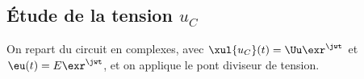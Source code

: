 \documentclass[../../main/main.tex]{subfiles}
\begin{document}
\begin{tcb}
\begin{isd}
		\begin{center}
			\vspace{-15pt}
		\end{center}
	\end{isd}
\end{tcb}

\subsection{Étude de la tension $u_C$}
On repart du circuit en complexes, avec $\xul{u_C}(t) = \Uu\exr^{\jwt}$ et
$\eu(t) = E\exr^{\jwt}$, et on applique le pont diviseur de tension.
\end{document}
